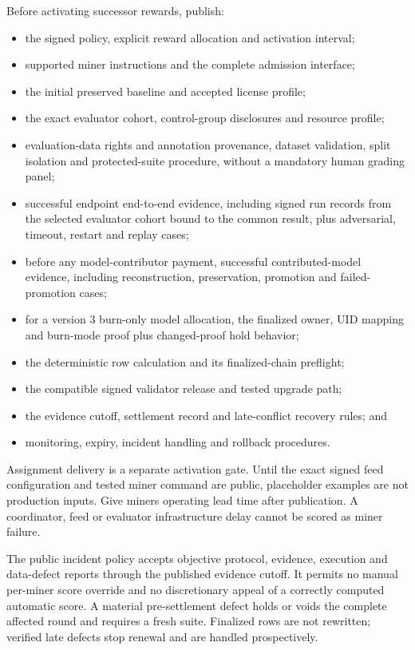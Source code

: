 Before activating successor rewards, publish:

\begin{itemize}
\tightlist
\item
  the signed policy, explicit reward allocation and activation interval;
\item
  supported miner instructions and the complete admission interface;
\item
  the initial preserved baseline and accepted license profile;
\item
  the exact evaluator cohort, control-group disclosures and resource profile;
\item
  evaluation-data rights and annotation provenance, dataset validation, split
  isolation and protected-suite procedure, without a mandatory human grading panel;
\item
  successful endpoint end-to-end evidence, including signed run records from the
  selected evaluator cohort bound to the common result, plus adversarial,
  timeout, restart and replay cases;
\item
  before any model-contributor payment, successful contributed-model evidence,
  including reconstruction, preservation, promotion and failed-promotion cases;
\item
  for a version 3 burn-only model allocation, the finalized owner, UID mapping
  and burn-mode proof plus changed-proof hold behavior;
\item
  the deterministic row calculation and its finalized-chain preflight;
\item
  the compatible signed validator release and tested upgrade path;
\item
  the evidence cutoff, settlement record and late-conflict recovery rules; and
\item
  monitoring, expiry, incident handling and rollback procedures.
\end{itemize}

Assignment delivery is a separate activation gate. Until the exact signed feed
configuration and tested miner command are public, placeholder examples are not
production inputs. Give miners operating lead time after publication. A
coordinator, feed or evaluator infrastructure delay cannot be scored as miner
failure.

The public incident policy accepts objective protocol, evidence, execution and
data-defect reports through the published evidence cutoff. It permits no manual
per-miner score override and no discretionary appeal of a correctly computed
automatic score. A material pre-settlement defect holds or voids the complete
affected round and requires a fresh suite. Finalized rows are not rewritten;
verified late defects stop renewal and are handled prospectively.


